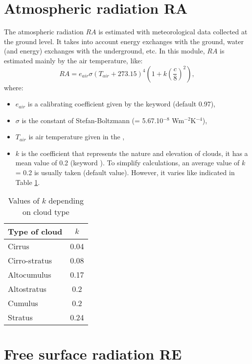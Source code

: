 \section{Atmospheric radiation RA}

The atmospheric radiation $RA$ is estimated with meteorological
data collected at the ground level.
It takes into account energy exchanges with the ground, water
(and energy) exchanges with the underground, etc.
In this module, $RA$ is estimated mainly by the air temperature, like:
\begin{equation*}
RA=e_{air}\sigma\left(T_{air}+273.15 \right)^4\left(1+k\left(\frac{c}{8}\right)^2 \right),
\end{equation*}
where:
\begin{itemize}
\item $e_{air}$ is a calibrating coefficient given by the keyword
   (default 0.97),
\item $\sigma$ is the constant of Stefan-Boltzmann (= 5.67.10${}^{-8}$ Wm${}^{-2}$K${}^{-4}$),
\item $T_{air}$ is air temperature given in the ,
\item $k$ is the coefficient that represents the nature and elevation of clouds,
it has a mean value of 0.2 (keyword ).
To simplify calculations, an average value of $k$ = 0.2 is usually taken
(default value).
However, it varies like indicated in Table \ref{tab:kcloud}.
\end{itemize}

\begin{table}
  \centering
  \begin{tabular}{|l|c|}
     \hline
     Type of cloud & $k$ \\
     \hline \hline
     Cirrus & 0.04 \\
     Cirro-stratus & 0.08 \\
     Altocumulus & 0.17 \\
     Altostratus & 0.2 \\
     Cumulus & 0.2 \\
     Stratus & 0.24\\
     \hline
   \end{tabular}
  \caption{Values of $k$ depending on cloud type}\label{tab:kcloud}
\end{table}


\section{Free surface radiation RE}

